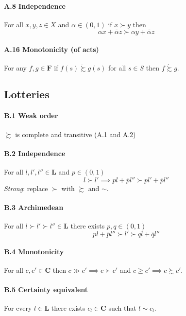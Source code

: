 \documentclass[landscape, 12pt]{extarticle}
\begin{document}
\begin{multicols}{2}
	\paragraph{A.8 Independence}
	For all $x, y, z \in X$ and $\alpha \in (0,1)$
	if $x \succ y$ then
	\[
		\alpha x + \overline \alpha z \succ \alpha y + \overline \alpha z
	\]

	\paragraph{A.16 Monotonicity (of acts)}
	For any $f, g \in \bm F$ if $f(s) \ddot \succsim g(s)$ for all $s \in S$ then $f \dot \succsim g$.

	\subsection{Lotteries}
	\paragraph{B.1 Weak order}
	$\succsim$ is complete and transitive (A.1 and A.2)

	\paragraph{B.2 Independence}
	For all $l, l', l'' \in \bm L$ and $p \in (0,1)$
	\[
		l \succ l' \implies pl + \overline p l'' \succ p l' + \overline p l''
	\]
	\textit{Strong}: replace $\succ$ with $\succsim$ and $\sim$.

	\paragraph{B.3 Archimedean}
	For all $l \succ l' \succ l'' \in \bm L$ there exists $p,q \in (0,1)$
	\[
		pl + \overline p l'' \succ l' \succ ql + \overline q l''
	\]

	\paragraph{B.4 Monotonicity}
	For all $c, c' \in \bm C$ then $c \gg c' \implies c\succ c'$ and $c \geq c' \implies c \succsim c'$.

	\paragraph{B.5 Certainty equivalent}
	For every $l \in \bm L$ there exists $c_l \in \bm C$ such that $l \sim c_l$.


\end{multicols}
\end{document}
